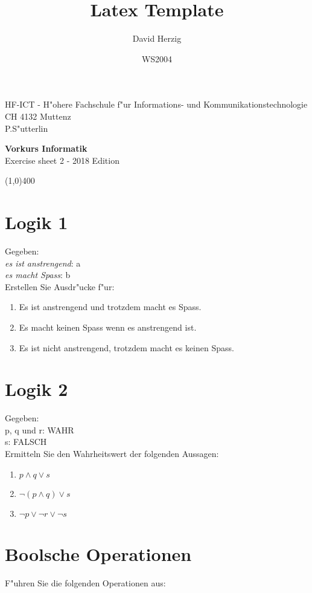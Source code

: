 \documentclass[a4paper,10pt]{article}
\title{Latex Template}
\author{David Herzig}
\date{WS2004}
\begin{document}
HF-ICT - H"ohere Fachschule f"ur Informations- und Kommunikationstechnologie\\
CH 4132 Muttenz\\
P.S"utterlin

\vspace{2mm}

\begin{center}
{\Large \bf Vorkurs Informatik}\\
Exercise sheet 2 - 2018 Edition
\end{center}

\vspace{2mm}

\line(1,0){400}

\vspace{5mm}

\section{Logik 1}
Gegeben:\\
\emph{es ist anstrengend}: a\\
\emph{es macht Spass}: b\\
Erstellen Sie Ausdr"ucke f"ur:

\begin{enumerate}
\item Es ist anstrengend und trotzdem macht es Spass.
\item Es macht keinen Spass wenn es anstrengend ist.
\item Es ist nicht anstrengend, trotzdem macht es keinen Spass.
\end{enumerate}

\section{Logik 2}
Gegeben:\\
p, q und r: WAHR\\
s: FALSCH\\
Ermitteln Sie den Wahrheitswert der folgenden Aussagen:

\begin{enumerate}
\item $p \land q \lor s$
\item $\lnot (p \land q) \lor s$
\item $\lnot p \lor \lnot r \lor \lnot s$
\end{enumerate}

\section{Boolsche Operationen}
F"uhren Sie die folgenden Operationen aus:
\end{document}
